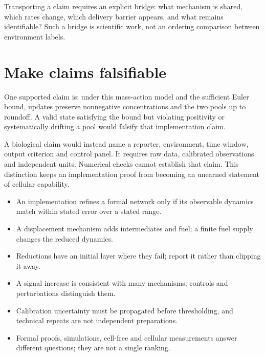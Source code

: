 Transporting a claim requires an explicit bridge: what mechanism is shared,
which rates change, which delivery barrier appears, and what remains
identifiable? Such a bridge is scientific work, not an ordering comparison
between environment labels.

\section{Make claims falsifiable}
One supported claim is: under this mass-action model and the sufficient Euler
bound, updates preserve nonnegative concentrations and the two pools up to
roundoff. A valid state satisfying the bound but violating positivity or
systematically drifting a pool would falsify that implementation claim.

A biological claim would instead name a reporter, environment, time window,
output criterion and control panel. It requires raw data, calibrated observations
and independent units. Numerical checks cannot establish that claim.
This distinction keeps an implementation proof from becoming an unearned
statement of cellular capability.

\begin{KeyIdeas}
\begin{itemize}\setlength{\itemsep}{2pt}
\item An implementation refines a formal network only if its observable dynamics
match within stated error over a stated range.
\item A displacement mechanism adds intermediates and fuel; a finite fuel supply
changes the reduced dynamics.
\item Reductions have an initial layer where they fail; report it rather than
clipping it away.
\item A signal increase is consistent with many mechanisms; controls and
perturbations distinguish them.
\item Calibration uncertainty must be propagated before thresholding, and
technical repeats are not independent preparations.
\item Formal proofs, simulations, cell-free and cellular measurements answer
different questions; they are not a single ranking.
\end{itemize}
\end{KeyIdeas}

